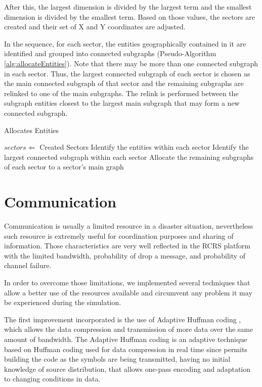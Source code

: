 \documentclass{llncs}
\begin{document}
After this, the largest dimension is divided by the largest term and the smallest dimension is divided by the smallest term. Based on those values, the sectors are created and their set of X and Y coordinates are adjusted.

In the sequence, for each sector, the entities geographically contained in it are identified and grouped into connected subgraphs (Pseudo-Algorithm \ref{alg:allocateEntities}). Note that there may be more than one connected subgraph in each sector. Thus, the largest connected subgraph of each sector is chosen as the main connected subgraph of that sector and the remaining subgraphs are relinked to one of the main subgraphs. The relink is performed between the subgraph entities closest to the largest main subgraph that may form a new connected subgraph.
\begin{algorithm}
  \caption{Allocates Entities}
  \label{alg:allocateEntities}
  \begin{algorithmic}
    \REQUIRE $sectors \Leftarrow$ Created Sectors
    \STATE
    \STATE Identify the entities within each sector
    \STATE Identify the largest connected subgraph within each sector
    \STATE Allocate the remaining subgraphs of each sector to a sector's main graph
  \end{algorithmic}
\end{algorithm}
\section{Communication}
\label{sec:communication}
Communication is usually a limited resource in a disaster situation, nevertheless such resource is extremely useful for coordination purposes and sharing of information. Those characteristics are very well reflected in the RCRS platform with the limited bandwidth, probability of drop a message, and probability of channel failure.

In order to overcome those limitations, we implemented several techniques that allow a better use of the resources available and circumvent any problem it may be experienced during the simulation.

The first improvement incorporated is the use of Adaptive Huffman coding \cite{vitter1987}, which allows the data compression and transmission of more data over the same amount of bandwidth. The Adaptive Huffman coding is an adaptive technique based on Huffman coding \cite{huffman1952} used for data compression in real time since permits building the code as the symbols are being transmitted, having no initial knowledge of source distribution, that allows one-pass encoding and adaptation to changing conditions in data.
\end{document}
